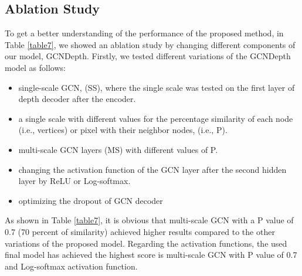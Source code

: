 \documentclass[journal]{IEEEtran}
\begin{document}
\subsection{Ablation Study}
To get a better understanding of the performance of the proposed method, in Table \ref{table7}, we showed an ablation study by changing different components of our model, GCNDepth. Firstly, we tested different variations of the GCNDepth model as follows:
\begin{itemize}
    \item single-scale GCN, (SS), where the single scale was tested on the first layer of depth decoder after the encoder.
    \item a single scale with different values for the percentage similarity of each node (i.e., vertices) or pixel with their neighbor nodes, (i.e., P).
    \item multi-scale GCN layers (MS) with different values of P.
    \item changing the activation function of the GCN layer after the second hidden layer by ReLU or Log-softmax.
    \item optimizing the dropout of GCN decoder
\end{itemize}

As shown in Table \ref{table7}, it is obvious that multi-scale GCN with a P value of 0.7 (70 percent of similarity) achieved higher results compared to the other variations of the proposed model. Regarding the activation functions, the used final model has achieved the highest score is multi-scale GCN with P value of 0.7 and Log-softmax activation function. 
\end{document}
